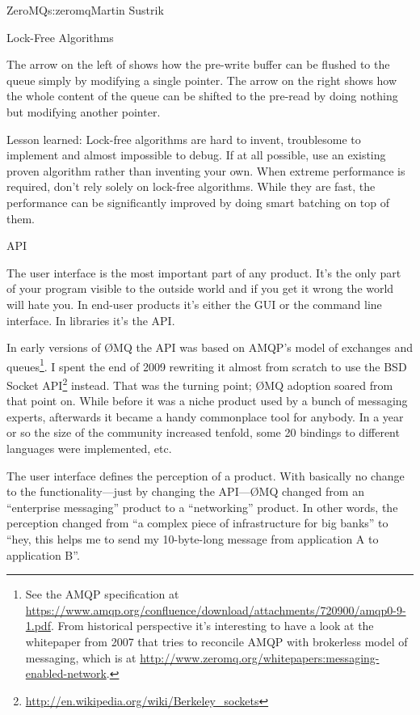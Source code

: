 \begin{aosachapter}{ZeroMQ}{s:zeromq}{Martin Sustrik}
\begin{aosasect1}{Lock-Free Algorithms}

The arrow on the left of  shows how
the pre-write buffer can be flushed to the queue simply by modifying a
single pointer. The arrow on the right shows how the whole content of the
queue can be shifted to the pre-read by doing nothing but modifying
another pointer.

Lesson learned: Lock-free algorithms are hard to invent, troublesome
to implement and almost impossible to debug. If at all possible, use
an existing proven algorithm rather than inventing your own. When
extreme performance is required, don't rely solely on lock-free
algorithms. While they are fast, the performance can be significantly
improved by doing smart batching on top of them.

\end{aosasect1}

\begin{aosasect1}{API}

The user interface is the most important part of any product. It's the
only part of your program visible to the outside world and if you get
it wrong the world will hate you. In end-user products it's either the GUI
or the command line interface. In libraries it's the API.

In early versions of {\O}MQ the API was based on AMQP's model of
exchanges and queues\footnote{See the AMQP specification at
  \url{https://www.amqp.org/confluence/download/attachments/720900/amqp0-9-1.pdf}. From
  historical perspective it's interesting to have a look at the
  whitepaper from 2007 that tries to reconcile AMQP with brokerless
  model of messaging, which is at
  \url{http://www.zeromq.org/whitepapers:messaging-enabled-network}.}. I
spent the end of 2009 rewriting it almost from scratch to use the BSD
Socket
API\footnote{\url{http://en.wikipedia.org/wiki/Berkeley_sockets}}
instead. That was the turning point; {\O}MQ adoption soared from that
point on. While before it was a niche product used by a bunch of
messaging experts, afterwards it became a handy commonplace tool for
anybody. In a year or so the size of the community increased tenfold,
some 20 bindings to different languages were implemented, etc.

The user interface defines the perception of a product. With basically
no change to the functionality---just by changing the API---{\O}MQ 
changed from an ``enterprise messaging'' product to a ``networking''
product. In other words, the perception changed from ``a complex piece
of infrastructure for big banks'' to ``hey, this helps me to send my
10-byte-long message from application A to application B''.


\end{aosasect1}
\end{aosachapter}
